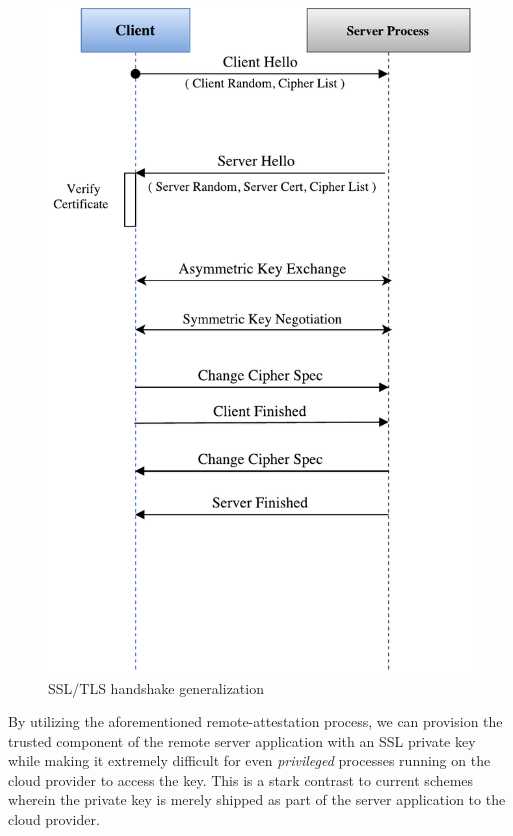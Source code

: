 \documentclass[../main.tex]{subfiles}
\begin{document}
\begin{figure}[H] \centering
  \includegraphics[scale=0.44]{images/abstract-handshake.pdf}
  \caption{SSL/TLS handshake generalization}
  \label{fig:abshandshake}
\end{figure}

By utilizing the aforementioned remote-attestation process, we can
provision the trusted component of the remote server application with
an SSL private key while making it extremely difficult for even
\textit{privileged} processes running on the cloud provider to access
the key. This is a stark contrast to current schemes wherein the
private key is merely shipped as part of the server application to the
cloud provider.
\end{document}
